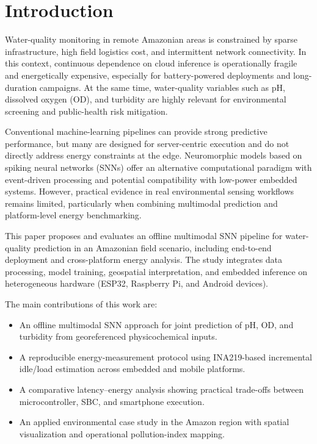 \section{Introduction}

Water-quality monitoring in remote Amazonian areas is constrained by sparse infrastructure, high field logistics cost, and intermittent network connectivity. In this context, continuous dependence on cloud inference is operationally fragile and energetically expensive, especially for battery-powered deployments and long-duration campaigns. At the same time, water-quality variables such as pH, dissolved oxygen (OD), and turbidity are highly relevant for environmental screening and public-health risk mitigation.

Conventional machine-learning pipelines can provide strong predictive performance, but many are designed for server-centric execution and do not directly address energy constraints at the edge. Neuromorphic models based on spiking neural networks (SNNs) offer an alternative computational paradigm with event-driven processing and potential compatibility with low-power embedded systems. However, practical evidence in real environmental sensing workflows remains limited, particularly when combining multimodal prediction and platform-level energy benchmarking.

This paper proposes and evaluates an offline multimodal SNN pipeline for water-quality prediction in an Amazonian field scenario, including end-to-end deployment and cross-platform energy analysis. The study integrates data processing, model training, geospatial interpretation, and embedded inference on heterogeneous hardware (ESP32, Raspberry Pi, and Android devices).

The main contributions of this work are:
\begin{itemize}
\item An offline multimodal SNN approach for joint prediction of pH, OD, and turbidity from georeferenced physicochemical inputs.
\item A reproducible energy-measurement protocol using INA219-based incremental idle/load estimation across embedded and mobile platforms.
\item A comparative latency--energy analysis showing practical trade-offs between microcontroller, SBC, and smartphone execution.
\item An applied environmental case study in the Amazon region with spatial visualization and operational pollution-index mapping.
\end{itemize}
